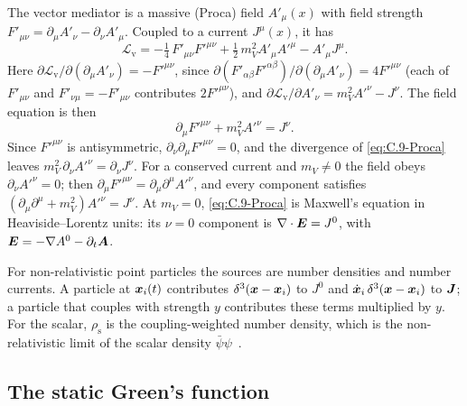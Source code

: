 The vector mediator is a massive (Proca) field $A'_\mu(x)$ with field strength $F'_{\mu\nu} = \partial_\mu A'_\nu - \partial_\nu A'_\mu$. Coupled to a current $J^\mu(x)$, it has
\begin{equation}
  \mathcal{L}_{\mathrm{v}} = -\tfrac14\,F'_{\mu\nu}F'^{\mu\nu} + \tfrac12\,m_V^2 A'_\mu A'^\mu - A'_\mu J^\mu .
  \label{eq:C.9-Lv}
\end{equation}
Here $\partial\mathcal{L}_{\mathrm{v}}/\partial(\partial_\mu A'_\nu) = -F'^{\mu\nu}$, since $\partial(F'_{\alpha\beta}F'^{\alpha\beta})/\partial(\partial_\mu A'_\nu) = 4F'^{\mu\nu}$ (each of $F'_{\mu\nu}$ and $F'_{\nu\mu} = -F'_{\mu\nu}$ contributes $2F'^{\mu\nu}$), and $\partial\mathcal{L}_{\mathrm{v}}/\partial A'_\nu = m_V^2A'^\nu - J^\nu$. The field equation is then
\begin{equation}
  \partial_\mu F'^{\mu\nu} + m_V^2 A'^\nu = J^\nu .
  \label{eq:C.9-Proca}
\end{equation}
Since $F'^{\mu\nu}$ is antisymmetric, $\partial_\nu\partial_\mu F'^{\mu\nu} = 0$, and the divergence of \cref{eq:C.9-Proca} leaves $m_V^2\,\partial_\nu A'^\nu = \partial_\nu J^\nu$. For a conserved current and $m_V \neq 0$ the field obeys $\partial_\nu A'^\nu = 0$; then $\partial_\mu F'^{\mu\nu} = \partial_\mu\partial^\mu A'^\nu$, and every component satisfies $(\partial_\mu\partial^\mu + m_V^2)A'^\nu = J^\nu$. At $m_V = 0$, \cref{eq:C.9-Proca} is Maxwell's equation in Heaviside--Lorentz units: its $\nu = 0$ component is $\nabla\cdot\bm{E} = J^0$, with $\bm{E} = -\nabla A^0 - \partial_t\bm{A}$.

For non-relativistic point particles the sources are number densities and number currents. A particle at $\bm{x}_i(t)$ contributes $\delta^3(\bm{x} - \bm{x}_i)$ to $J^0$ and $\dot{\bm{x}}_i\,\delta^3(\bm{x} - \bm{x}_i)$ to $\bm{J}$; a particle that couples with strength $y$ contributes these terms multiplied by $y$. For the scalar, $\rho_{\mathrm{s}}$ is the coupling-weighted number density, which is the non-relativistic limit of the scalar density $\bar\psi\psi$~\cite[Eq.~(7)]{knapen2021dark}.

\subsection{The static Green's function}

